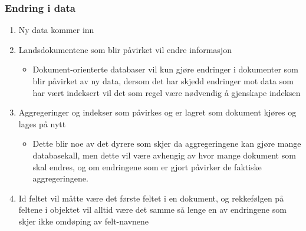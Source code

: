 \subsubsection{Endring i data}
\begin{enumerate}
  \item Ny data kommer inn
  \item Landsdokumentene som blir påvirket vil endre informasjon
  \begin{itemize}
    \item Dokument-orienterte databaser vil kun gjøre endringer i dokumenter som blir påvirket av ny data, dersom det har skjedd endringer mot data som har vært indeksert vil det som regel være nødvendig å gjenskape indeksen
  \end{itemize}
  \item Aggregeringer og indekser som påvirkes og er lagret som dokument kjøres og lages på nytt
  \begin{itemize}
    \item Dette blir noe av det dyrere som skjer da aggregeringene kan gjøre mange databasekall, men dette vil være avhengig av hvor mange dokument som skal endres,
    og om endringene som er gjort påvirker de faktiske aggregeringene.
  \end{itemize}
  \item Id feltet vil måtte være det første feltet i en dokument, og rekkefølgen på feltene i objektet vil alltid være det samme så lenge en av endringene som skjer ikke omdøping av felt-navnene 
\end{enumerate}